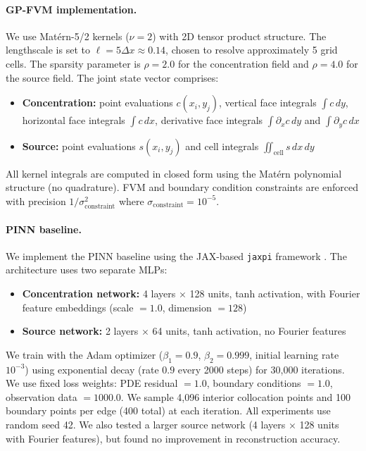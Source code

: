 \documentclass{article}
\theoremstyle{plain}
\theoremstyle{definition}
\theoremstyle{remark}
\begin{document}
\paragraph{GP-FVM implementation.}
We use Mat\'ern-5/2 kernels ($\nu = 2$) with 2D tensor product structure.
The lengthscale is set to $\ell = 5 \Delta x \approx 0.14$, chosen to resolve approximately 5 grid cells.
The sparsity parameter is $\rho = 2.0$ for the concentration field and $\rho = 4.0$ for the source field.
The joint state vector comprises:
\begin{itemize}[nosep]
  \item \textbf{Concentration:} point evaluations $c(x_i, y_j)$, vertical face integrals $\int c \, dy$, horizontal face integrals $\int c \, dx$, derivative face integrals $\int \partial_x c \, dy$ and $\int \partial_y c \, dx$
  \item \textbf{Source:} point evaluations $s(x_i, y_j)$ and cell integrals $\iint_{\text{cell}} s \, dx\,dy$
\end{itemize}
All kernel integrals are computed in closed form using the Mat\'ern polynomial structure (no quadrature).
FVM and boundary condition constraints are enforced with precision $1/\sigma_{\text{constraint}}^2$ where $\sigma_{\text{constraint}} = 10^{-5}$.

\paragraph{PINN baseline.}
We implement the PINN baseline using the JAX-based \texttt{jaxpi} framework \citep{wangExpertsGuideTraining2023a}.
The architecture uses two separate MLPs:
\begin{itemize}[nosep]
  \item \textbf{Concentration network:} 4 layers $\times$ 128 units, tanh activation, with Fourier feature embeddings (scale $= 1.0$, dimension $= 128$)
  \item \textbf{Source network:} 2 layers $\times$ 64 units, tanh activation, no Fourier features
\end{itemize}
We train with the Adam optimizer ($\beta_1 = 0.9$, $\beta_2 = 0.999$, initial learning rate $10^{-3}$) using exponential decay (rate $0.9$ every 2000 steps) for 30{,}000 iterations.
We use fixed loss weights: PDE residual $= 1.0$, boundary conditions $= 1.0$, observation data $= 1000.0$.
We sample 4{,}096 interior collocation points and 100 boundary points per edge (400 total) at each iteration.
All experiments use random seed 42.
We also tested a larger source network (4 layers × 128 units with Fourier features), but found no improvement in reconstruction accuracy.
\end{document}
